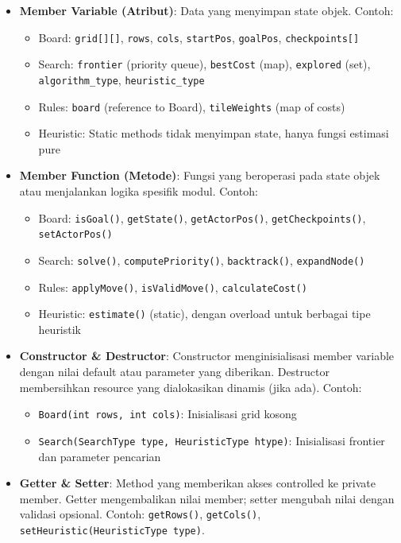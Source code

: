 \begin{itemize}
    \item \textbf{Member Variable (Atribut)}: Data yang menyimpan state objek. Contoh:
          \begin{itemize}
              \item Board: \texttt{grid[][]}, \texttt{rows}, \texttt{cols}, \texttt{startPos}, \texttt{goalPos}, \texttt{checkpoints[]}
              \item Search: \texttt{frontier} (priority queue), \texttt{bestCost} (map), \texttt{explored} (set), \texttt{algorithm\_type}, \texttt{heuristic\_type}
              \item Rules: \texttt{board} (reference to Board), \texttt{tileWeights} (map of costs)
              \item Heuristic: Static methods tidak menyimpan state, hanya fungsi estimasi pure
          \end{itemize}

    \item \textbf{Member Function (Metode)}: Fungsi yang beroperasi pada state objek atau menjalankan logika spesifik modul. Contoh:
          \begin{itemize}
              \item Board: \texttt{isGoal()}, \texttt{getState()}, \texttt{getActorPos()}, \texttt{getCheckpoints()}, \texttt{setActorPos()}
              \item Search: \texttt{solve()}, \texttt{computePriority()}, \texttt{backtrack()}, \texttt{expandNode()}
              \item Rules: \texttt{applyMove()}, \texttt{isValidMove()}, \texttt{calculateCost()}
              \item Heuristic: \texttt{estimate()} (static), dengan overload untuk berbagai tipe heuristik
          \end{itemize}

    \item \textbf{Constructor \& Destructor}: Constructor menginisialisasi member variable dengan nilai default atau parameter yang diberikan. Destructor membersihkan resource yang dialokasikan dinamis (jika ada). Contoh:
          \begin{itemize}
              \item \texttt{Board(int rows, int cols)}: Inisialisasi grid kosong
              \item \texttt{Search(SearchType type, HeuristicType htype)}: Inisialisasi frontier dan parameter pencarian
          \end{itemize}

    \item \textbf{Getter \& Setter}: Method yang memberikan akses controlled ke private member. Getter mengembalikan nilai member; setter mengubah nilai dengan validasi opsional. Contoh: \texttt{getRows()}, \texttt{getCols()}, \texttt{setHeuristic(HeuristicType type)}.
\end{itemize}

